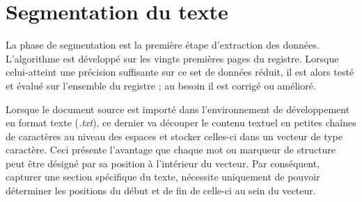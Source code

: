 \section{Segmentation du texte}
La phase de segmentation est la première étape d'extraction des données.
L'algorithme est développé sur les vingts premières pages du registre. Lorsque celui-atteint une précision suffisante sur ce set de données réduit, il est alors testé et évalué sur l'ensemble du registre ; au besoin il est corrigé ou amélioré.

Lorsque le document source est importé dans l'environnement de développement en format texte (\textit{.txt}), ce dernier va découper le contenu textuel en petites chaînes de caractères au niveau des espaces et stocker celles-ci dans un vecteur de type caractère. Ceci présente l'avantage que chaque mot ou marqueur de structure peut être désigné par sa position à l'intérieur du vecteur. Par conséquent, capturer une section spécifique du texte, nécessite uniquement de pouvoir déterminer les positions du début et de fin de celle-ci au sein du vecteur.  

